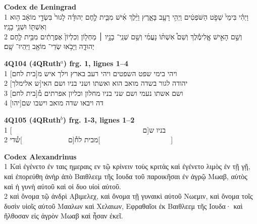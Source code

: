 \documentclass[11pt,a4paper]{article}
\begin{document}
\textbf{Codex de Leningrad}\\
\texthebrew{
\textfrench{1}
וַיְהִ֗י בִּימֵי֙ שְׁפֹ֣ט הַשֹּׁפְטִ֔ים וַיְהִ֥י רָעָ֖ב בָּאָ֑רֶץ וַיֵּ֨לֶךְ אִ֜ישׁ מִבֵּ֧ית לֶ֣חֶם יְהוּדָ֗ה לָגוּר֙ בִּשְׂדֵ֣י מוֹאָ֔ב ה֥וּא וְאִשְׁתּ֖וֹ וּשְׁנֵ֥י בָנָֽיו׃\\
\textfrench{2}
וְשֵׁ֣ם הָאִ֣ישׁ אֱ‍ֽלִימֶ֡לֶךְ וְשֵׁם֩ אִשְׁתּ֨וֹ נָעֳמִ֜י וְשֵׁ֥ם שְׁנֵֽי־ בָנָ֣יו ׀ מַחְל֤וֹן וְכִלְיוֹן֙ אֶפְרָתִ֔ים מִבֵּ֥ית לֶ֖חֶם יְהוּדָ֑ה וַיָּבֹ֥אוּ שְׂדֵי־ מוֹאָ֖ב וַיִּֽהְיוּ־ שָֽׁם׃\\}


\textbf{4Q104 (4QRuth${^a}$) frg. 1, lignes 1--4}\\
\texthebrew{
\textfrench{1}
 ויהי בימי שפט השפטים ויהי רעב בארץ וילך איש מ[בית לחם]\\
\textfrench{2}
יהודה לגור בשדה מואב הוא ואשתו ושני בניו ושם האי[ש אלימלך]\\
\textfrench{3}
ושם אשתו נעמי ושם שני בניו מחלון וכליון אפרתים מ֯[בית לחם]\\
\textfrench{4}
 [יהו]דה ויבאו שדה מואב וישבו שם\\
 }

\textbf{4Q105 (4QRuth${^b}$) frg. 1-3, lignes 1--2}\\

\texthebrew{
\textfrench{1}
בניו  ש[ם~~~~~~~~~~~~~~~~~~~~~~~~~~~~~~~~~~~~~]\\
\textfrench{2}
מבית לח֯[ם~~~~~~~~~~~~~]ש֯די[~~~~~~~~~~~~~~~~~~~~]\\
}

\textbf{Codex Alexandrinus}\\
1 \textgreek{Καὶ ἐγένετο ἐν ταις ημεραις εν τῷ κρίνειν τοὺς κριτὰς καὶ ἐγένετο λιμὸς ἐν τῇ γῇ, καὶ ἐπορεύθη ἀνὴρ ἀπὸ Βαιθλεεμ τῆς Ιουδα τοῦ παροικῆσαι ἐν ἀγρῷ Μωαβ, αὐτὸς καὶ ἡ γυνὴ αὐτοῦ καὶ οἱ δυο υἱοὶ αὐτοῦ.}\\
2 \textgreek{καὶ ὄνομα τῷ ἀνδρὶ Αβιμελεχ, καὶ ὄνομα τῇ γυναικὶ αὐτοῦ Νωεμιν, καὶ ὄνομα τοῖς δυσὶν υἱοῖς αὐτοῦ Μααλων καὶ Χελαιων, Εφραθαῖοι ἐκ Βαιθλεεμ τῆς Ιουδα· καὶ ἤλθοσαν εἰς ἀγρὸν Μωαβ καὶ ἦσαν ἐκεῖ.}\\
    
\end{document}
